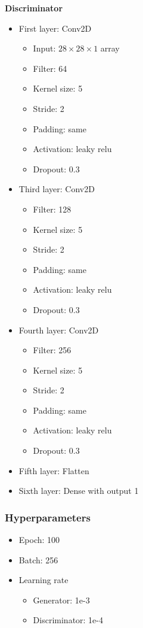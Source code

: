 \documentclass{article}
\begin{document}
\begin{multicols*}{2}
\vfill\null
\columnbreak

\textbf{Discriminator}
\begin{itemize}
  \item First layer: Conv2D
    \begin{itemize}
      \item Input: $28 \times 28\times 1$ array
      \item Filter: 64
      \item Kernel size: 5
      \item Stride: 2
      \item Padding: same
      \item Activation: leaky relu
      \item Dropout: 0.3
  \end{itemize} 
  \item Third layer: Conv2D
    \begin{itemize}
      \item Filter: 128
      \item Kernel size: 5
      \item Stride: 2
      \item Padding: same
      \item Activation: leaky relu
      \item Dropout: 0.3
    \end{itemize}   
  \item Fourth layer: Conv2D
    \begin{itemize}
      \item Filter: 256
      \item Kernel size: 5
      \item Stride: 2
      \item Padding: same
      \item Activation: leaky relu
      \item Dropout: 0.3
    \end{itemize} 
  \item Fifth layer: Flatten
  \item Sixth layer: Dense with output 1
\end{itemize}
\end{multicols*}

\subsubsection{Hyperparameters}

\begin{itemize}
  \item Epoch: 100
  \item Batch: 256
  \item Learning rate
    \begin{itemize}
      \item Generator: 1e-3
      \item Discriminator: 1e-4
    \end{itemize}
\end{itemize}
\end{document}
